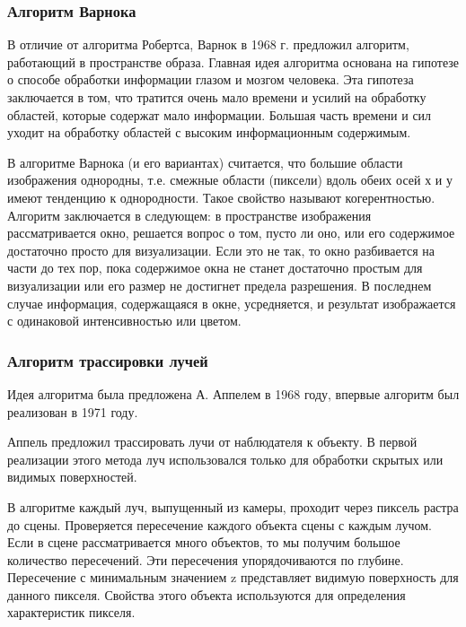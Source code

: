 \documentclass[14pt,a4paper]{extarticle}
\begin{document}
    	\subsubsection*{Алгоритм Варнока}
    	
    		В отличие от алгоритма Робертса, Варнок в 1968 г. предложил алгоритм, работающий в пространстве образа. 
    		Главная идея алгоритма основана на гипотезе о способе обработки информации глазом и мозгом человека. 
    		Эта гипотеза заключается в том, что тратится очень мало времени и усилий на обработку областей, 
    		которые содержат мало информации. 
    		Большая часть времени и сил уходит на обработку областей с высоким информационным содержимым.
    
    		В алгоритме Варнока (и его вариантах) считается, что большие области изображения однородны, 
    		т.е. смежные области (пиксели) вдоль обеих осей х и у имеют тенденцию к однородности. Такое свойство называют когерентностью.
    		Алгоритм заключается в следующем: в пространстве изображения рассматривается окно, решается вопрос о том, пусто ли оно, 
    		или его содержимое достаточно просто для визуализации. 
    		Если это не так, то окно разбивается на части до тех пор, 
    		пока содержимое окна не станет достаточно простым для визуализации или его размер не достигнет предела разрешения. 
    		В последнем случае информация, содержащаяся в окне, усредняется, 
    		и результат изображается с одинаковой интенсивностью или цветом.
    
    
    	\subsubsection*{Алгоритм трассировки лучей}
    
	    	Идея алгоритма была предложена А. Аппелем в 1968 году, впервые алгоритм был реализован в 1971 году.
    
     		Аппель предложил трассировать лучи от наблюдателя к объекту. 
     		В первой реализации этого метода луч использовался только для обработки скрытых или видимых поверхностей.
     
     	 	В алгоритме каждый луч, выпущенный из камеры, проходит через пиксель растра до сцены. 
     	 	Проверяется пересечение каждого объекта сцены с каждым лучом. Если в сцене рассматривается много объектов, 
     	 	то мы получим большое количество пересечений. Эти пересечения упорядочиваются по глубине. 
     	 	Пересечение с минимальным значением z представляет видимую поверхность для данного пикселя. 
     	 	Свойства этого объекта используются для определения характеристик пикселя.
     
\end{document}
